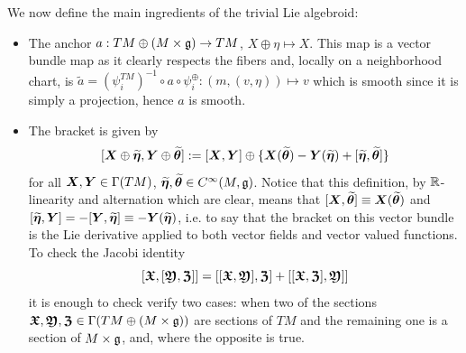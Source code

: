 We now define the main ingredients of the trivial Lie algebroid:
    \begin{itemize}
    \item The anchor $a: TM \oplus (M \times \mathfrak{g}) \to TM$, $X \oplus \eta \mapsto X$. This map is a vector bundle map as it clearly respects the fibers and, locally on a neighborhood chart, is $\tilde a = (\psi^{TM}_i)^{-1} \circ a \circ \psi^{\oplus}_i: (m, (v, \eta)) \mapsto v$ which is smooth since it is simply a projection, hence $a$ is smooth.
    
    \item The bracket is given by 
    \[
        [\bm{X} \oplus \widetilde{\bm{\eta}}, \bm{Y} \oplus \widetilde{\bm{\theta}}] := [\bm{X}, \bm{Y}] \oplus \{\bm{X}(\widetilde{\bm{\theta}}) - \bm{Y}(\widetilde{\bm{\eta}}) + [\widetilde{\bm{\eta}}, \widetilde{\bm{\theta}}]\}
    \]
    for all $\bm{X}, \bm{Y} \in \Gamma(TM)$, $\widetilde{\bm{\eta}}, \widetilde{\bm{\theta}} \in C^\infty(M, \mathfrak{g})$.%
    Notice that this definition, by $\mathbb{R}$-linearity and alternation which are clear, means that $[\bm{X}, \widetilde{\bm{\theta}}] \equiv \bm{X}(\widetilde{\bm{\theta}})$ and $[\widetilde{\bm{\eta}}, \bm{Y}] = - [\bm{Y}, \widetilde{\bm{\eta}}] \equiv -\bm{Y}(\widetilde{\bm{\eta}})$, i.e. to say that the bracket on this vector bundle is the Lie derivative applied to both vector fields and vector valued functions. %
    To check the Jacobi identity
    \[ [\bm{\mathfrak{X}}, [\bm{\mathfrak{Y}}, \bm{\mathfrak{Z}}]] = [[\bm{\mathfrak{X}}, \bm{\mathfrak{Y}}], \bm{\mathfrak{Z}}] + [[\bm{\mathfrak{X}}, \bm{\mathfrak{Z}}], \bm{\mathfrak{Y}}]] \] it is enough to check verify two cases: when two of the sections $\bm{\mathfrak{X}}, \bm{\mathfrak{Y}}, \bm{\mathfrak{Z}} \in \Gamma(TM \oplus (M \times \mathfrak{g}))$ are sections of $TM$ and the remaining one is a section of $M \times \mathfrak{g}$, and, where the opposite is true.
    \end{itemize}

